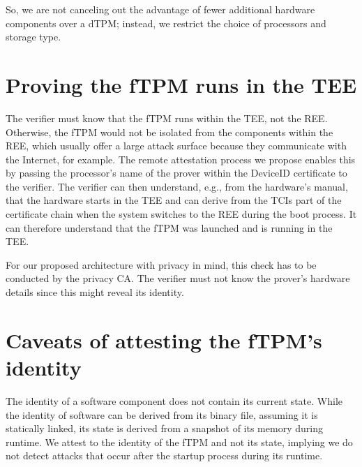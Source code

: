 So, we are not canceling out the advantage of fewer additional hardware components over a \ac{dTPM}; instead, we restrict the choice of processors and storage type.




\section{Proving the fTPM runs in the TEE}

The verifier must know that the fTPM runs within the TEE, not the REE\@.
Otherwise, the fTPM would not be isolated from the components within the REE, which usually offer a large attack surface because they communicate with the Internet, for example.
The remote attestation process we propose enables this by passing the processor's name of the prover within the DeviceID certificate to the verifier.
The verifier can then understand, e.g., from the hardware's manual, that the hardware starts in the TEE and can derive from the TCIs part of the certificate chain when the system switches to the REE during the boot process.
It can therefore understand that the fTPM was launched and is running in the TEE\@.

For our proposed architecture with privacy in mind, this check has to be conducted by the privacy CA\@.
The verifier must not know the prover's hardware details since this might reveal its identity.

\section{Caveats of attesting the fTPM's identity}

The identity of a software component does not contain its current state.
While the identity of software can be derived from its binary file, assuming it is statically linked, its state is derived from a snapshot of its memory during runtime.
We attest to the identity of the fTPM and not its state, implying we do not detect attacks that occur after the startup process during its runtime.
